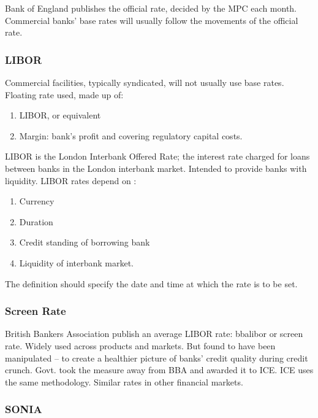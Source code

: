 \documentclass[
]{article}
\providecommand{\tightlist}{%
  \setlength{\itemsep}{0pt}\setlength{\parskip}{0pt}}
\begin{document}
Bank of England publishes the official rate, decided by the MPC each
month. Commercial banks' base rates will usually follow the movements of
the official rate.

\hypertarget{libor}{%
\subsubsection{LIBOR}\label{libor}}

Commercial facilities, typically syndicated, will not usually use base
rates. Floating rate used, made up of:

\begin{enumerate}
\tightlist
\item
  LIBOR, or equivalent
\item
  Margin: bank's profit and covering regulatory capital costs.
\end{enumerate}

LIBOR is the London Interbank Offered Rate; the interest rate charged
for loans between banks in the London interbank market. Intended to
provide banks with liquidity. LIBOR rates depend on :

\begin{enumerate}
\tightlist
\item
  Currency
\item
  Duration
\item
  Credit standing of borrowing bank
\item
  Liquidity of interbank market.
\end{enumerate}

The definition should specify the date and time at which the rate is to
be set.

\hypertarget{screen-rate}{%
\subsubsection{Screen Rate}\label{screen-rate}}

British Bankers Association publish an average LIBOR rate: bbalibor or
screen rate. Widely used across products and markets. But found to have
been manipulated -- to create a healthier picture of banks' credit
quality during credit crunch. Govt. took the measure away from BBA and
awarded it to ICE. ICE uses the same methodology. Similar rates in other
financial markets.

\hypertarget{sonia}{%
\subsubsection{SONIA}\label{sonia}}
\end{document}

